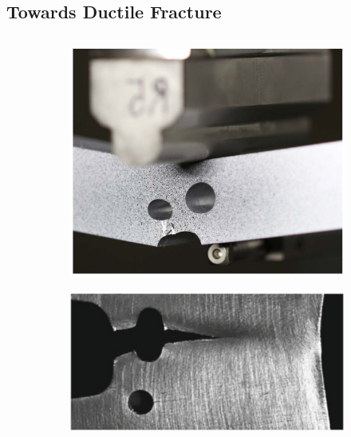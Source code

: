 \subsection{Towards Ductile Fracture}
\subsectioncover

\begin{frame}
  \vspace{-1.5em}
  \begin{columns}
    \begin{column}{0.2\textwidth}
      \vspace{-1em}
      \begin{figure}
        \centering
        \begin{subfigure}{\textwidth}
          \centering
          \includegraphics[width=\textwidth]{Chapter345/figures/3pb_real_crack}
        \end{subfigure}
        \begin{subfigure}{\textwidth}
          \centering
          \includegraphics[width=\textwidth]{Chapter345/figures/SFC_schematics}

\end{subfigure}
\end{figure}
\end{column}
\end{columns}
\end{frame}
